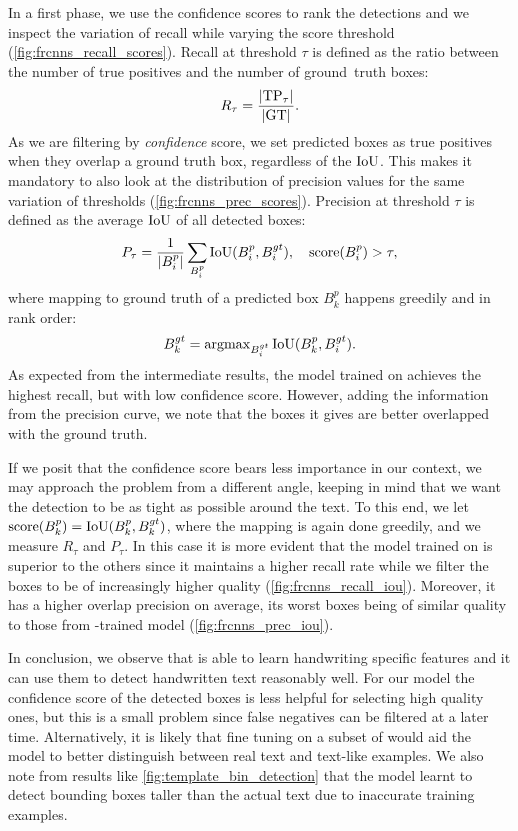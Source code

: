 	In a first phase, we use the confidence scores to rank the detections and we inspect the variation of recall while varying the score threshold (\autoref{fig:frcnns_recall_scores}). Recall at threshold \(\tau\) is defined as the ratio between the number of true positives and the number of \mbox{ground truth} boxes:
	\[
		R_{\tau} = \frac{\left\vert\operatorname{TP}_\tau\right\vert}{\left\vert\operatorname{GT}\right\vert}.
	\]
	As we are filtering by \emph{confidence} score, we set predicted boxes as true positives when they overlap a ground truth box, regardless of the \(\operatorname{IoU}\). This makes it mandatory to also look at the distribution of precision values for the same variation of thresholds (\autoref{fig:frcnns_prec_scores}). Precision at threshold \(\tau\) is defined as the average \(\operatorname{IoU}\) of all detected boxes:
	\[
			P_\tau = \frac{1}{\left\vert B^p_i\right\vert} \sum_{B^p_{i}} \operatorname{IoU}(B^p_i, B^{gt}_i),~~~\operatorname{score}(B^p_i ) > \tau,
	\]
	where mapping to ground truth of a predicted box \(B^p_k\) happens greedily and in rank order:
	\[
			B^{gt}_k = \operatorname{argmax}_{B^{gt}_i} \operatorname{IoU}(B^p_k, B^{gt}_i).
	\]
	As expected from the intermediate results, the model trained on  achieves the highest recall, but with low confidence score. However, adding the information from the precision curve, we note that the boxes it gives are better overlapped with the ground truth.

	If we posit that the confidence score bears less importance in our context, we may approach the problem from a different angle, keeping in mind that we want the detection to be as tight as possible around the text. To this end, we let \(\operatorname{score}(B^p_k) = \operatorname{IoU}(B^p_k, B^{gt}_k)\), where the mapping is again done greedily, and we measure \(R_\tau\) and \(P_\tau\). In this case it is more evident that the model trained on  is superior to the others since it maintains a higher recall rate while we filter the boxes to be of increasingly higher quality (\autoref{fig:frcnns_recall_iou}). Moreover, it has a higher overlap precision on average, its worst boxes being of similar quality to those from -trained model (\autoref{fig:frcnns_prec_iou}).

	In conclusion, we observe that \FRCNN{} is able to learn handwriting specific features and it can use them to detect handwritten text reasonably well. For our model the confidence score of the detected boxes is less helpful for selecting high quality ones, but this is a small problem since false negatives can be filtered at a later time. Alternatively, it is likely that fine tuning on a subset of  would aid the model to better distinguish between real text and text-like examples. We also note from results like \autoref{fig:template_bin_detection} that the model learnt to detect bounding boxes taller than the actual text due to inaccurate training examples.

